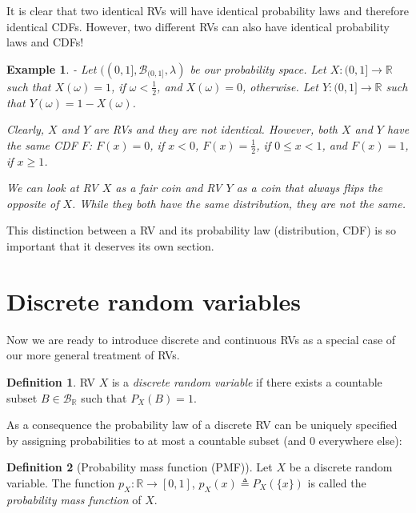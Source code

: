 \documentclass{book}
\theoremstyle{plain}%
\newtheorem{prototheorem}{Example}[section]
\newenvironment{cexample}
   {\colorlet{shadecolor}{gray!10}\begin{shaded}\begin{prototheorem}}
   {\end{prototheorem}\end{shaded}}
\theoremstyle{definition}
\newtheorem{definition}{Definition}[section]
\newlength{\arrow}
\begin{document}
It is clear that two identical RVs will have identical probability laws and therefore identical CDFs. However, two different RVs can also have identical probability laws and CDFs! 

\begin{cexample}{}{-}
Let $((0, 1], \mathcal{B}_{(0,1]}, \lambda)$ be our probability space. Let $X: (0, 1] \to \mathbb{R}$ such that $X(\omega) = 1$, if $\omega < \frac{1}{2}$, and $X(\omega) = 0$, otherwise. Let $Y: (0, 1] \to \mathbb{R}$ such that $Y(\omega) = 1 - X(\omega)$.

Clearly, $X$ and $Y$ are RVs and they are not identical. However, both $X$ and $Y$ have the same CDF $F$: $F(x) = 0$, if $x < 0$, $F(x) = \frac{1}{2}$, if $0 \leq x < 1$, and $F(x) = 1$, if $x \geq 1$.

We can look at RV $X$ as a fair coin and RV $Y$ as a coin that always flips the opposite of $X$. While they both have the same distribution, they are not the same.
\end{cexample}

This distinction between a RV and its probability law (distribution, CDF) is so important that it deserves its own section.

\section{Discrete random variables}

Now we are ready to introduce discrete and continuous RVs as a special case of our more general treatment of RVs.

\begin{definition}
RV $X$ is a \emph{discrete random variable} if there exists a countable subset $B \in \mathcal{B}_\mathbb{R}$ such that $P_X(B) = 1$.
\end{definition}

As a consequence the probability law of a discrete RV can be uniquely specified by assigning probabilities to at most a countable subset (and 0 everywhere else):

\begin{definition}[Probability mass function (PMF)]
Let $X$ be a discrete random variable. The function $p_X: \mathbb{R} \rightarrow [0,1]$, $p_X(x) \triangleq P_X(\{x\})$ is called the \emph{probability mass function} of $X$.
\end{definition}
\end{document}
